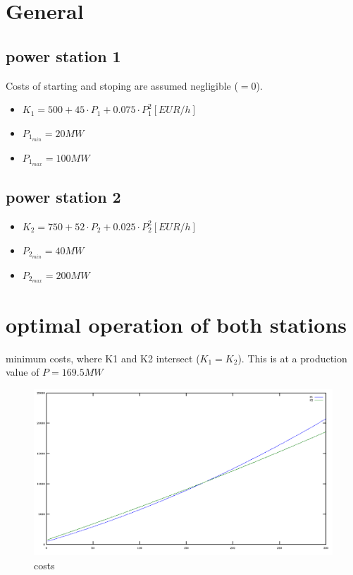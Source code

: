 \documentclass{article}
\begin{document}
	\section*{General}
		\subsection*{power station 1}
			Costs of starting and stoping are assumed negligible ($=0$).
			\begin{itemize}
				\item $K_1=500+45\cdot P_1+0.075\cdot P_1^2 [EUR/h]$
				\item $P_{1_{min}}=20MW$
				\item $P_{1_{max}}=100MW$
			\end{itemize}
		\subsection*{power station 2}
			\begin{itemize}
				\item $K_2=750+52\cdot P_2+0.025\cdot P_2^2 [EUR/h]$
				\item $P_{2_{min}}=40MW$
				\item $P_{2_{max}}=200MW$
			\end{itemize}
	\section{optimal operation of both stations}
		minimum costs, where K1 and K2 intersect ($K_1=K_2$). This is at a production value of $P=169.5MW$

\begin{figure}[htbp]
\begin{center}
\includegraphics[width=15cm,keepaspectratio=true]{costs}
\caption{costs}
\label{increasing costs for both power stations}
\end{center}
\end{figure}
\end{document}
